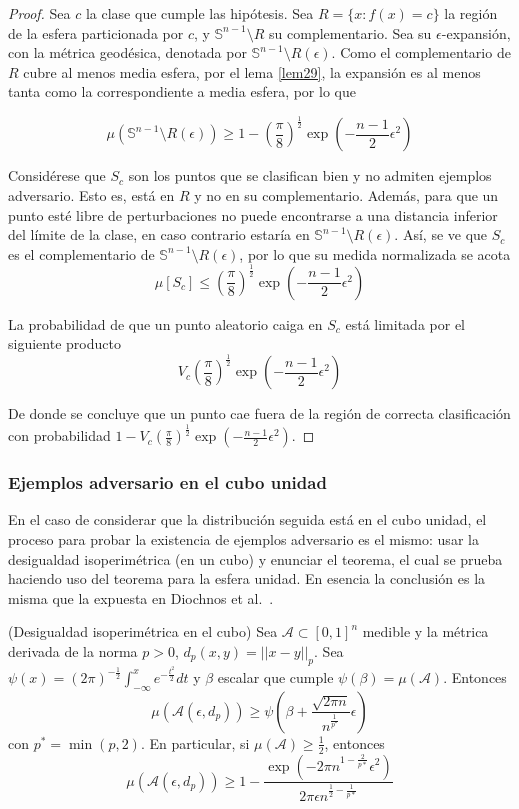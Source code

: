 \begin{proof}
Sea $c$ la clase que cumple las hipótesis. Sea $R = \{x : f(x) = c\}$ la región de la esfera particionada por $c$, y $\mathbb{S}^{n-1} \setminus R$ su complementario. Sea su $\epsilon$-expansión, con la métrica geodésica, denotada por $\mathbb{S}^{n-1}\setminus R(\epsilon)$. Como el complementario de $R$ cubre al menos media esfera, por el lema \ref{lem29}, la expansión es al menos tanta como la correspondiente a media esfera, por lo que


$$\mu(\mathbb{S}^{n-1}\setminus R(\epsilon)) \geq 1 - \left( \frac{\pi}{8} \right)^{\frac{1}{2}}\exp \left( -\frac{n-1}{2}\epsilon^2 \right)$$

Considérese que $S_c$ son los puntos que se clasifican bien y no admiten ejemplos adversario. Esto es, está en $R$ y no en su complementario. Además, para que un punto esté libre de perturbaciones no puede encontrarse a una distancia inferior del límite de la clase, en caso contrario estaría en $\mathbb{S}^{n-1}\setminus R(\epsilon)$. Así, se ve que $S_c$ es el complementario de $\mathbb{S}^{n-1}\setminus R(\epsilon)$, por lo que su medida normalizada se acota
$$\mu[S_c] \leq \left( \frac{\pi}{8} \right)^{\frac{1}{2}}\exp \left( - \frac{n-1}{2} \epsilon^2 \right)$$ 

La probabilidad de que un punto aleatorio caiga en $S_c$ está limitada por el siguiente producto
$$V_c \left( \frac{\pi}{8} \right)^{\frac{1}{2}}\exp \left( -\frac{n-1}{2} \epsilon^2 \right) $$

De donde se concluye que un punto cae fuera de la región de correcta clasificación con probabilidad $1 - V_c \left( \frac{\pi}{8} \right)^{\frac{1}{2}} \exp\left( -\frac{n-1}{2} \epsilon^2 \right)$.
\end{proof}

\subsubsection{Ejemplos adversario en el cubo unidad}

En el caso de considerar que la distribución seguida está en el cubo unidad, el proceso para probar la existencia de ejemplos adversario es el mismo: usar la desigualdad isoperimétrica (en un cubo) y enunciar el teorema, el cual se prueba haciendo uso del teorema para la esfera unidad. En esencia la conclusión es la misma que la expuesta en Diochnos et al.~\cite{LimitsAdvers}.

\begin{lema} (Desigualdad isoperimétrica en el cubo) \label{desisocubo}
Sea $\mathcal{A} \subset [0,1]^n$ medible y la métrica derivada de la norma $p>0$, $d_p(x,y)=||x-y||_p$. Sea $\psi(x)=(2 \pi)^{-\frac{1}{2}} \int_{- \infty}^x e^{-\frac{t^2}{2}}dt$ y $\beta$ escalar que cumple $\psi(\beta)=\mu(\mathcal{A})$. Entonces
$$\mu(\mathcal{A}(\epsilon,d_p)) \geq \psi \left( \beta+\frac{\sqrt{2 \pi n}}{n^{\frac{1}{p^*}}} \epsilon \right)$$
con $p^*=\min(p,2)$. En particular, si $\mu(\mathcal{A}) \geq \frac{1}{2}$, entonces
$$\mu(\mathcal{A}(\epsilon,d_p)) \geq 1 - \frac{\exp(-2 \pi n^{1-\frac{2}{p*}}\epsilon^2)}{2 \pi \epsilon n^{\frac{1}{2}-\frac{1}{p*}}}$$
\end{lema}


